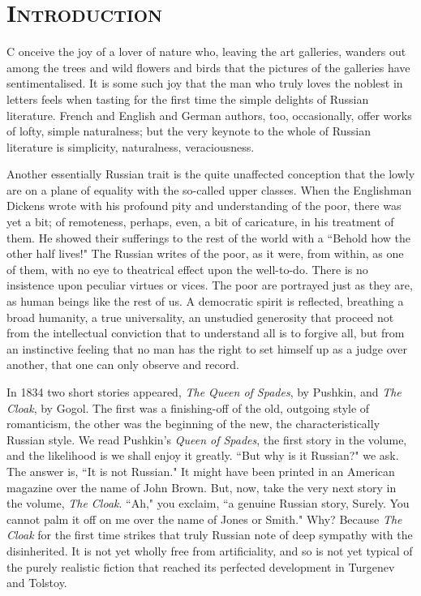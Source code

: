 \chapter{\textsc{Introduction}}


\lettrine[lines=3,lhang=0.11,lraise=0,loversize=0.05]{C}{}%
onceive the joy of a lover of nature who, leaving the art galleries,
wanders out among the trees and wild flowers and birds that the
pictures of the galleries have sentimentalised. It is some such joy
that the man who truly loves the noblest in letters feels when tasting
for the first time the simple delights of Russian literature. French
and English and German authors, too, occasionally, offer works of
lofty, simple naturalness; but the very keynote to the whole of
Russian literature is simplicity, naturalness, veraciousness.

Another essentially Russian trait is the quite unaffected conception
that the lowly are on a plane of equality with the so-called upper
classes. When the Englishman Dickens wrote with his profound pity and
understanding of the poor, there was yet a bit; of remoteness,
perhaps, even, a bit of caricature, in his treatment of them. He
showed their sufferings to the rest of the world with a ``Behold how
the other half lives!" The Russian writes of the poor, as it were,
from within, as one of them, with no eye to theatrical effect upon the
well-to-do. There is no insistence upon peculiar virtues or vices. The
poor are portrayed just as they are, as human beings like the rest of
us. A democratic spirit is reflected, breathing a broad humanity, a
true universality, an unstudied generosity that proceed not from the
intellectual conviction that to understand all is to forgive all, but
from an instinctive feeling that no man has the right to set himself
up as a judge over another, that one can only observe and record.

In 1834 two short stories appeared, \emph{The Queen of Spades}, by Pushkin,
and \emph{The Cloak}, by Gogol. The first was a finishing-off of the old,
outgoing style of romanticism, the other was the beginning of the new,
the characteristically Russian style. We read Pushkin's \emph{Queen of
Spades}, the first story in the volume, and the likelihood is we shall
enjoy it greatly. ``But why is it Russian?" we ask. The answer is, ``It
is not Russian." It might have been printed in an American magazine
over the name of John Brown. But, now, take the very next story in the
volume, \emph{The Cloak}. ``Ah," you exclaim, ``a genuine Russian story,
Surely. You cannot palm it off on me over the name of Jones or Smith."
Why? Because \emph{The Cloak} for the first time strikes that truly Russian
note of deep sympathy with the disinherited. It is not yet wholly free
from artificiality, and so is not yet typical of the purely realistic
fiction that reached its perfected development in Turgenev and
Tolstoy.

